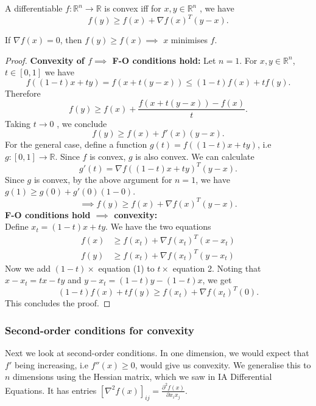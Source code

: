 \documentclass[a4paper]{scrartcl}
\begin{document}
\begin{theorem}
	 A differentiable $f:\mathbb{R}^n\rightarrow \mathbb{R}$ is convex iff for $x,y \in \mathbb{R}^{n} $ , we have 
	 \[f(y) \geq f(x)+\nabla f(x)^T (y-x).\]  
\end{theorem}

\begin{remark}
	If $\nabla f(x)=0$, then $f(y)\geq f(x) \implies$ $x$ minimises $f$.
\end{remark}

\begin{proof}
	\textbf{Convexity of $f \implies$ F-O conditions hold:}\newline 
	 Let $n=1$. For $x,y\in \mathbb{R}^{n}$, $t \in [0,1]$ we have 
	 \[f((1-t)x+ty)=f(x+t(y-x))\leq (1-t)f(x)+tf(y).\]
	 Therefore 
	 \[f(y) \geq f(x)+\frac{f(x+t(y-x))-f(x)}{t}.\] 
	 Taking $t \rightarrow 0$ , we conclude 
	 \[f(y) \geq f(x)+f'(x)(y-x).\]
	 For the general case, define a function $g(t)=f((1-t)x+ty)$, i.e $g: [0,1] \rightarrow \mathbb{R}$. Since $f$ is convex, $g$ is also convex. We can calculate 
	 \[g'(t)=\nabla f((1-t)x+ty)^T(y-x).\] 
	 Since $g$ is convex, by the above argument for $n=1$, we have $g(1)\geq g(0)+g'(0)(1-0)$. 
	 \[\implies f(y) \geq f(x)+\nabla f(x)^T(y-x).\] 
	 \textbf{F-O conditions hold $\implies$ convexity:}\\
	 Define $x_t=(1-t)x+ty$. We have the two equations
	 \begin{align}
		 f(x) &\geq f(x_t)+\nabla f(x_t)^T (x-x_t)\\
		 f(y) &\geq f(x_t)+\nabla f(x_t)^T (y-x_t)
	 \end{align}
	 Now we add $(1-t)\times$ equation (1) to $t \times$ equation 2. Noting that $x-x_t=tx-ty$ and $y-x_t=(1-t)y-(1-t)x$, we get 
	 \[(1-t)f(x)+tf(y)\geq f(x_t)+\nabla f(x_t)^T (0).\] 
	 This concludes the proof.
\end{proof}

\subsubsection{Second-order conditions for convexity}

Next we look at second-order conditions. In one dimension, we would expect that $f'$ being increasing, i.e $f''(x) \geq 0$, would give us convexity. We generalise this to $n$ dimensions using the Hessian matrix, which we saw in IA Differential Equations. It has entries $[\nabla^2f(x)]_{ij}=\frac{\partial^2 f(x)}{\partial x_i x_j} $.
\end{document}

